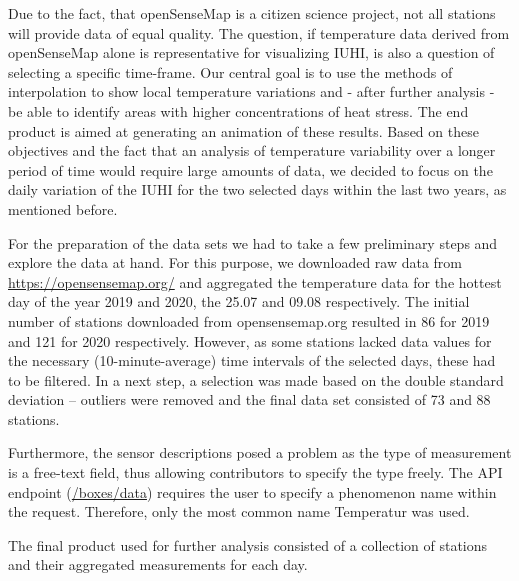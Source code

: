 Due to the fact, that openSenseMap is a citizen science project, not all stations will provide data of equal quality. The question, if temperature data derived from openSenseMap alone is representative for visualizing IUHI, is also a question of selecting a specific time-frame. Our central goal is to use the methods of interpolation to show local temperature variations and - after further analysis - be able to identify areas with higher concentrations of heat stress. The end product is aimed at generating an animation of these results. Based on these objectives and the fact that an analysis of temperature variability over a longer period of time would require large amounts of data, we decided to focus on the daily variation of the IUHI for the two selected days within the last two years, as mentioned before.

For the preparation of the data sets we had to take a few preliminary steps and explore the data at hand. For this purpose, we downloaded raw data from \url{https://opensensemap.org/} and aggregated the temperature data for the hottest day of the year 2019 and 2020, the 25.07 and 09.08 respectively. The initial number of stations downloaded from opensensemap.org resulted in 86 for 2019 and 121 for 2020 respectively. However, as some stations lacked data values for the necessary (10-minute-average) time intervals of the selected days, these had to be filtered. In a next step, a selection was made based on the double standard deviation – outliers were removed and the final data set consisted of 73 and 88 stations.

Furthermore, the sensor descriptions posed a problem as the type of measurement is a free-text field, thus allowing contributors to specify the type freely. The API endpoint (\url{/boxes/data}) requires the user to specify a phenomenon name within the request. Therefore, only the most common name \ldq{}Temperatur\rdq{} was used.

The final product used for further analysis consisted of a collection of stations and their aggregated measurements for each day.






